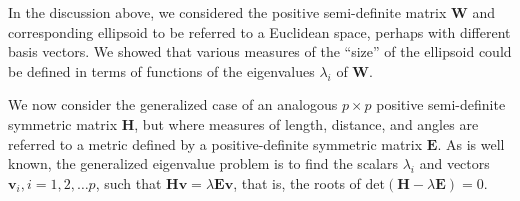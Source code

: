 \documentclass[11pt]{article}%
\renewcommand*{\vec}[1]{\ensuremath{\bm{#1}}}
\newcommand*{\mat}[1]{\ensuremath{\bm{#1}}}
\renewcommand*{\det}[1]{\ensuremath{\mathrm{det} (#1)}}
\begin{document}
In the discussion above, we considered the positive semi-definite matrix \mat{W} and
corresponding ellipsoid to be
referred to a Euclidean space, perhaps with different basis vectors.
We showed that various measures of the ``size'' of the ellipsoid could be defined
in terms of functions of the eigenvalues $\lambda_i$ of \mat{W}.

We now consider the generalized
case of an analogous $p \times p$ positive semi-definite symmetric matrix \mat{H}, but where measures of
length, distance, and angles are referred to a metric defined by a positive-definite symmetric
matrix \mat{E}. As is well known, the generalized eigenvalue problem is to find the scalars
$\lambda_i$ and vectors $\vec{v}_i, i=1, 2, \dots p$,
such that $\mat{H} \vec{v} = \lambda \mat{E} \vec{v}$, that is, the roots of
$\det{\mat{H} - \lambda \mat{E}}=0$.
\end{document}
